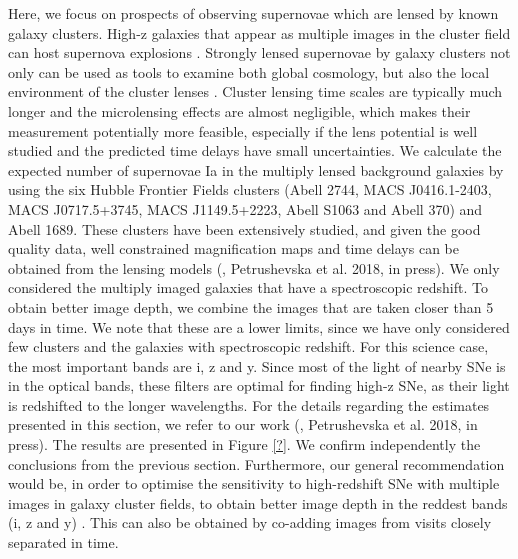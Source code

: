 Here, we focus on prospects of observing supernovae which are lensed by known galaxy clusters. High-z galaxies that appear as multiple images in the cluster field can host supernova explosions \citep{2015Sci...347.1123K, 2016ApJ...819L...8K}. Strongly lensed supernovae by galaxy clusters not only can be used as tools to examine both global cosmology, but also the local environment of the cluster lenses \citep{2014ApJ...786....9P,2014MNRAS.440.2742N, 2015ApJ...811...70R}. Cluster lensing time scales are typically much longer and the microlensing effects are almost negligible, which makes their measurement potentially more feasible, especially if the lens potential is well studied and the predicted time delays have small uncertainties. We calculate the expected number of supernovae Ia in the multiply lensed background galaxies by using the six Hubble Frontier Fields clusters \citep{2017ApJ...837...97L}  (Abell 2744, MACS J0416.1-2403, MACS J0717.5+3745, MACS J1149.5+2223, Abell S1063 and Abell 370) and Abell 1689. These clusters have been extensively studied, and given the good quality data, well constrained magnification maps and time delays can be obtained from the lensing models (\cite{2016A&A...594A..54P, 2018A&A...614A.103P}, Petrushevska et al. 2018, in press). We only considered the multiply imaged galaxies that have a spectroscopic redshift. To obtain better image depth, we combine the images that are taken closer than 5 days in time. We note that these are a lower limits, since we have only considered few clusters and the galaxies with spectroscopic redshift. For this science case, the most important bands are i, z and y. Since most of the light of nearby SNe is in the optical bands, these filters are optimal for finding high-z SNe, as their light is redshifted to the longer wavelengths. For the details regarding the estimates presented in this section, we refer to our work (\cite{2018A&A...614A.103P,2016A&A...594A..54P}, Petrushevska et al. 2018, in press). The results are presented in Figure \ref{?}. We confirm independently the conclusions from the previous section. Furthermore, our general recommendation would be, in order to optimise the sensitivity to high-redshift SNe with multiple images in galaxy cluster fields, to obtain better image depth in the reddest bands (i, z and y) . This can also be obtained by co-adding images from visits closely separated in time.


